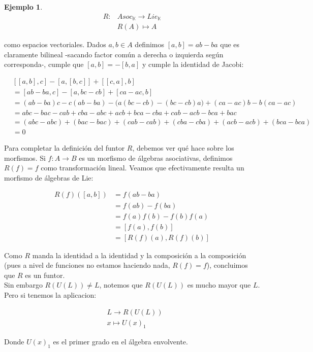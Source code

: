 \documentclass{article}
\newcommand{\cuerpo}{\mathbb{K}}
\theoremstyle{plain}
\theoremstyle{definition}
\newtheorem{ejemplo}[theorem]{Ejemplo}
\theoremstyle{remark}
\begin{document}
\begin{ejemplo}
        \begin{align*}
            R: & Asoc_{\cuerpo} \longrightarrow Lie_\cuerpo \\
            & R(A) \longmapsto A 
        \end{align*}

        como espacios vectoriales. Dados $a,b \in A$ definimos $[a,b] = ab-ba$ que es claramente bilineal -sacando factor común a derecha o izquierda según corresponda-, cumple que $[a,b] = -[b,a]$ y cumple la identidad de Jacobi:

        \begin{align*}
            & [[a,b],c] - [a,[b,c]] + [[c,a],b] \\
            &= [ab-ba, c] - [a, bc-cb] + [ca-ac, b] \\
            &= (ab-ba)c - c(ab-ba) - \big(a(bc-cb) - (bc-cb)a\big) + (ca-ac)b - b(ca-ac) \\
            &= abc - bac - cab + cba - abc + acb + bca - cba + cab - acb - bca + bac \\
            &= (abc - abc) + (bac - bac) + (cab - cab) + (cba - cba) + (acb - acb) + (bca - bca) \\
            &= 0
        \end{align*}

        Para completar la definición del funtor $R$, debemos ver qué hace sobre los morfismos. Si $f: A \to B$ es un morfismo de álgebras asociativas, definimos $R(f) = f$ como transformación lineal. Veamos que efectivamente resulta un morfismo de álgebras de Lie:
        
        \begin{align*}
            R(f)([a,b]) &= f(ab - ba) \\
            &= f(ab) - f(ba) \\
            &= f(a)f(b) - f(b)f(a) \\
            &= [f(a), f(b)] \\
            &= [R(f)(a), R(f)(b)]
        \end{align*}

        Como $R$ manda la identidad a la identidad y la composición a la composición (pues a nivel de funciones no estamos haciendo nada, $R(f)=f$), concluimos que $R$ es un funtor. \\

        Sin  embargo $R(U(L)) \neq L$, notemos que $R(U(L))$ es mucho mayor que $L$. Pero si tenemos la aplicacion:
        
        \begin{align*}
            & L \longrightarrow R(U(L)) \\
            & x \mapsto U(x)_1
        \end{align*}

        Donde $U(x)_1$ es el primer grado en el álgebra envolvente.
\end{ejemplo}
\end{document}
